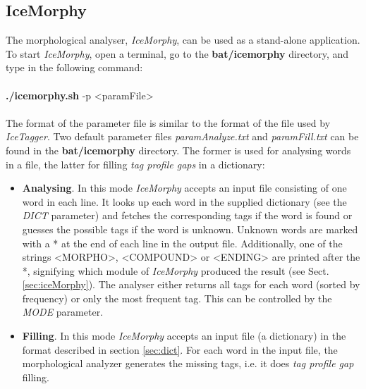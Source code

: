 \documentclass[11pt]{article}
\begin{document}
\subsection{IceMorphy}
The morphological analyser, \emph{IceMorphy}, can be used as a stand-alone application.
To start \emph{IceMorphy}, open a terminal, go to the \textbf{bat/icemorphy} directory, and type in the following command: \\ \\
{\bf ./icemorphy.sh} -p <paramFile> \\ \\
The format of the parameter file is similar to the format of the file used by \emph{IceTagger}.
Two default parameter files \emph{paramAnalyze.txt} and \emph{paramFill.txt} can be found in the \textbf{bat/icemorphy} directory.
The former is used for analysing words in a file, the latter for filling \emph{tag profile gaps} in a dictionary:
\begin{itemize}
\item {\bf Analysing}.
In this mode \emph{IceMorphy} accepts an input file consisting of one word in each line.
It looks up each word in the supplied dictionary (see the \emph{DICT} parameter) and fetches the corresponding tags if the word is found or guesses the possible tags if the word is unknown.
Unknown words are marked with a * at the end of each line in the output file.
Additionally, one of the strings <MORPHO>, <COMPOUND> or <ENDING> are printed after the *, signifying which module of \emph{IceMorphy} produced the result (see Sect. \ref{sec:iceMorphy}).
The analyser either returns all tags for each word (sorted by frequency) or only the most frequent tag.
This can be controlled by the \emph{MODE} parameter.
\item {\bf Filling}.
In this mode \emph{IceMorphy} accepts an input file (a dictionary) in the format described in section \ref{sec:dict}. For each word in the input file, the morphological analyzer generates the missing tags, i.e. it does \emph{tag profile gap} filling.
\end{itemize}
\end{document}
